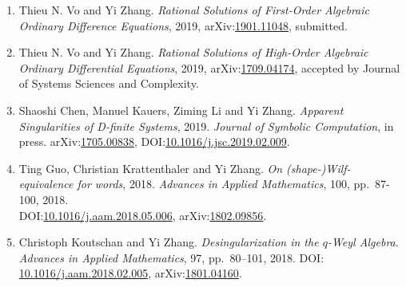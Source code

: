 \documentclass[a4paper,12pt]{article}
\begin{document}
\begin{enumerate}
 \item Thieu N. Vo and Yi Zhang. 
{\em Rational Solutions of First-Order Algebraic Ordinary Difference Equations}, 2019, 
arXiv:\href{http://arxiv.org/abs/1901.11048}{1901.11048}, submitted.
 \item Thieu N. Vo and Yi Zhang. {\em Rational Solutions of High-Order Algebraic Ordinary Differential Equations}, 2019, 
 arXiv:\href{https://arxiv.org/abs/1709.04174}{1709.04174}, accepted by Journal of Systems Sciences and Complexity.
  \item Shaoshi Chen, Manuel Kauers, Ziming Li and Yi Zhang. {\em Apparent Singularities of D-finite Systems}, 2019. 
 {\em  Journal of Symbolic Computation}, in press. arXiv:\href{http://arxiv.org/abs/1705.00838}{1705.00838},  
 DOI:\href{https://doi.org/10.1016/j.jsc.2019.02.009}{10.1016/j.jsc.2019.02.009}.
\item Ting Guo, Christian Krattenthaler and Yi Zhang.
{\em On (shape-)Wilf-equivalence for words}, 2018.
{\em  Advances in Applied Mathematics}, 100, pp.\ 87-100, 2018. \\
DOI:\href{https://doi.org/10.1016/j.aam.2018.05.006}{10.1016/j.aam.2018.05.006}, 
arXiv:\href{https://arxiv.org/pdf/1802.09856.pdf}{1802.09856}.
\item Christoph Koutschan and Yi Zhang. {\em Desingularization in the $q$-Weyl Algebra}. 
{\em Advances in Applied Mathematics}, 97, pp.\ 80–101, 2018. 
DOI: \href{http://dx.doi.org/10.1016/j.aam.2018.02.005}{10.1016/j.aam.2018.02.005},
arXiv:\href{https://arxiv.org/abs/1801.04160}{1801.04160}.   

\end{enumerate}
\end{document}
